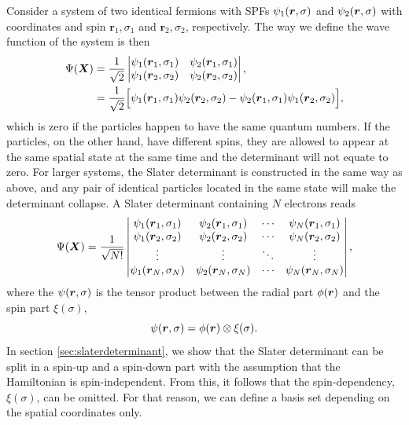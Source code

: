 Consider a system of two identical fermions with SPFs $\psi_1(\boldsymbol{{r}},\sigma)$ and $\psi_2(\boldsymbol{{r}},\sigma)$ with coordinates and spin $\boldsymbol{r}_1,\sigma_1$ and $\boldsymbol{r}_2,\sigma_2$, respectively. The way we define the wave function of the system is then
\begin{equation}
\begin{aligned}
\Psi(\boldsymbol{{X}})&=\frac{1}{\sqrt{2}}
\begin{vmatrix}
\psi_1(\boldsymbol{r}_1,\sigma_1) & \psi_2(\boldsymbol{r}_1,\sigma_1)\\
\psi_1(\boldsymbol{r}_2,\sigma_2) & \psi_2(\boldsymbol{r}_2,\sigma_2)
\end{vmatrix},\\
&=\frac{1}{\sqrt{2}}\Big[\psi_1(\boldsymbol{r}_1,\sigma_1)\psi_2(\boldsymbol{r}_2,\sigma_2)-\psi_2(\boldsymbol{r}_1,\sigma_1)\psi_1(\boldsymbol{r}_2,\sigma_2)\Big],
\end{aligned}
\end{equation}
which is zero if the particles happen to have the same quantum numbers. If the particles, on the other hand, have different spins, they are allowed to appear at the same spatial state at the same time and the determinant will not equate to zero. For larger systems, the Slater determinant is constructed in the same way as above, and any pair of identical particles located in the same state will make the determinant collapse. A Slater determinant containing $N$ electrons reads
\begin{equation}
\Psi(\boldsymbol{{X}})=\frac{1}{\sqrt{N!}}
\begin{vmatrix}
\psi_1(\boldsymbol{r}_1,\sigma_1) & \psi_2(\boldsymbol{r}_1,\sigma_1) & \cdots & \psi_N(\boldsymbol{r}_1,\sigma_1)\\
\psi_1(\boldsymbol{r}_2,\sigma_2) & \psi_2(\boldsymbol{r}_2,\sigma_2) & \cdots & \psi_N(\boldsymbol{r}_2,\sigma_2)\\
\vdots & \vdots & \ddots & \vdots \\
\psi_1(\boldsymbol{r}_N,\sigma_N) & \psi_2(\boldsymbol{r}_N,\sigma_N) & \cdots & \psi_N(\boldsymbol{r}_N,\sigma_N)
\end{vmatrix},
\end{equation}
where the $\psi(\boldsymbol{{r}},\sigma)$ is the tensor product between the radial part $\phi(\boldsymbol{{r}})$ and the spin part $\xi(\sigma)$,
\begin{equation}
\psi(\boldsymbol{{r}},\sigma)=\phi(\boldsymbol{{r}})\otimes\xi(\sigma).
\end{equation}
In section \ref{sec:slaterdeterminant}, we show that the Slater determinant can be split in a spin-up and a spin-down part with the assumption that the Hamiltonian is spin-independent. From this, it follows that the spin-dependency, $\xi(\sigma)$, can be omitted. For that reason, we can define a basis set depending on the spatial coordinates only.

